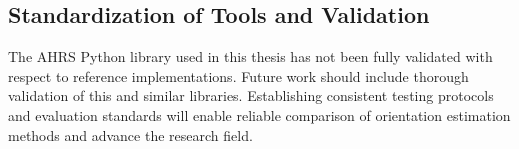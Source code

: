\documentclass{iutbscthesis}
\begin{document}
\subsection{Standardization of Tools and Validation}

The AHRS Python library used in this thesis has not been fully validated with respect to reference implementations. Future work should include thorough validation of this and similar libraries. Establishing consistent testing protocols and evaluation standards will enable reliable comparison of orientation estimation methods and advance the research field.












\sloppy  %

\printbib
\end{document}
